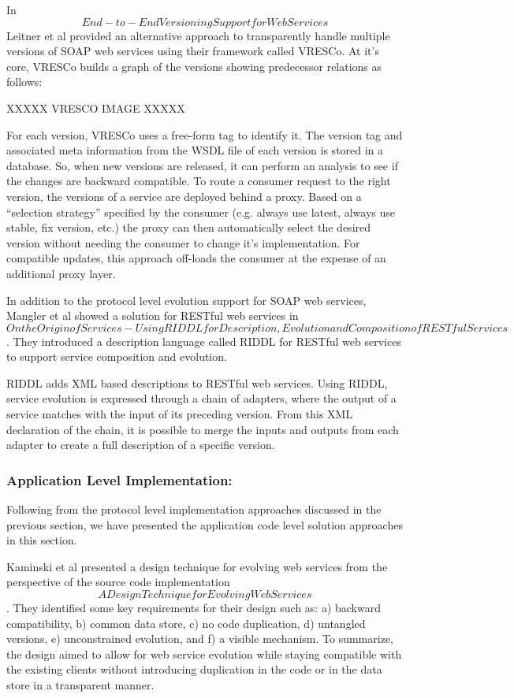 \documentclass[runningheads,a4paper]{llncs}
\begin{document}
In \[End-to-End Versioning Support for Web Services\] Leitner et al provided an alternative approach to transparently handle multiple versions of SOAP web services using their framework called VRESCo. At it’s core, VRESCo builds a graph of the versions showing predecessor relations as follows:

XXXXX VRESCO IMAGE XXXXX

For each version, VRESCo uses a free-form tag to identify it. The version tag and associated meta information from the WSDL file of each version is stored in a database. So, when new versions are released, it can perform an analysis to see if the changes are backward compatible. To route a consumer request to the right version, the versions of a service are deployed behind a proxy. Based on a ``selection strategy'' specified by the consumer (e.g. always use latest, always use stable, fix version, etc.) the proxy can then automatically select the desired version without needing the consumer to change it’s implementation. For compatible updates, this approach off-loads the consumer at the expense of an additional proxy layer.

In addition to the protocol level evolution support for SOAP web services, Mangler et al showed a solution for RESTful web services in \[On the Origin of Services - Using RIDDL for Description, Evolution and Composition of RESTful Services\]. They introduced a description language called RIDDL for RESTful web services to support service composition and evolution.

RIDDL adds XML based descriptions to RESTful web services. Using RIDDL, service evolution is expressed through a chain of adapters, where the output of a service matches with the input of its preceding version. From this XML declaration of the chain, it is possible to merge the inputs and outputs from each adapter to create a full description of a specific version.

\subsubsection{Application Level Implementation:}

Following from the protocol level implementation approaches discussed in the previous section, we have presented the application code level solution approaches in this section.

Kaminski et al presented a design technique for evolving web services from the perspective of the source code implementation \[A Design Technique for Evolving Web Services\]. They identified some key requirements for their design such as: a) backward compatibility, b) common data store, c) no code duplication, d) untangled versions, e) unconstrained evolution, and f) a visible mechanism. To summarize, the design aimed to allow for web service evolution while staying compatible with the existing clients without introducing duplication in the code or in the data store in a transparent manner.
\end{document}
